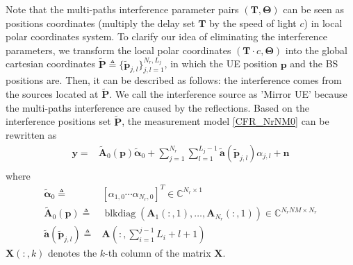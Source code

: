 \documentclass[journal]{IEEEtran}
\def \blkdiag{\operatorname{blkdiag}}
\begin{document}
Note that the multi-paths interference parameter pairs $(\mathbf{T},\boldsymbol{\Theta})$ can be seen as positions coordinates (multiply the delay set $\mathbf{T}$ by the speed of light $c$) in local polar coordinates system.
To clarify our idea of eliminating the interference parameters, we transform the local polar coordinates $(\mathbf{T}\cdot c,\boldsymbol{\Theta})$ into the global cartesian coordinates $\tilde{\boldsymbol{P}}\triangleq \{\tilde{\boldsymbol{p}}_{j,l}\}_{j,l=1}^{N_r,L_j}$, in which the UE position $\boldsymbol{p}$ and the BS positions are.
Then, it can be described as follows: the interference comes from the sources located at $\tilde{\boldsymbol{P}}$. We call the interference source as 'Mirror UE' because the multi-paths interference are caused by the reflections. 
Based on the interference positions set $\tilde{\boldsymbol{P}}$, the measurement model \eqref{CFR_NrNM0} can be rewritten as
\begin{align}\label{CFR_MirrorUE0}
  \boldsymbol{y}=&\tilde{\boldsymbol{A}}_0(\boldsymbol{p})\tilde{\boldsymbol{\alpha}}_0+\sum_{j=1}^{N_r}\sum_{l=1}^{L_j-1}\tilde{\boldsymbol{a}}(\tilde{\boldsymbol{p}}_{j,l})\alpha_{j,l}+\boldsymbol{n}\\\nonumber
\end{align}
where 
\begin{align}\label{CFR_MirrorUE1}
  \tilde{\boldsymbol{\alpha}}_0\triangleq&[\alpha_{1,0}\cdots \alpha_{N_r,0}]^T\in \mathbb{C}^{N_r\times 1}\\\nonumber
  \tilde{\boldsymbol{A}}_0(\boldsymbol{p})\triangleq&\blkdiag(\boldsymbol{A}_1(:,1),\dots ,\boldsymbol{A}_{N_r}(:,1))\in \mathbb{C}^{N_rNM\times N_r}\\\nonumber
  \tilde{\boldsymbol{a}}(\tilde{\boldsymbol{p}}_{j,l})\triangleq&\boldsymbol{A}(:,\sum_{i=1}^{j-1}L_i+l+1)
\end{align}
$\boldsymbol{X}(:,k)$ denotes the $k$-th column of the matrix $\boldsymbol{X}$.
\end{document}
